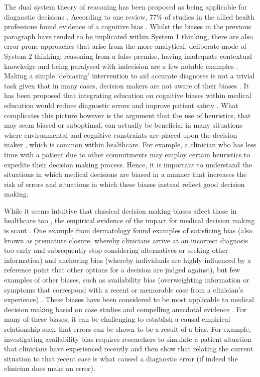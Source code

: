 \documentclass[a4paper, nobind]{templates/ociamthesis}
\begin{document}
\hfill\break
The dual system theory of reasoning has been proposed as being applicable for diagnostic decisions \autocite{croskerry_clinical_2009}. According to one review, 77\% of studies in the allied health professions found evidence of a cognitive bias \autocite{featherston_decision_2020}. Whilst the biases in the previous paragraph have tended to be implicated within System 1 thinking, there are also error-prone approaches that arise from the more analytical, deliberate mode of System 2 thinking: reasoning from a false premise, having inadequate contextual knowledge and being paralysed with indecision are a few notable examples \autocite{croskerry_deciding_2014}. Making a simple `debiasing' intervention to aid accurate diagnoses is not a trivial task given that in many cases, decision makers are not aware of their biases \autocite{croskerry_mindless_2013}. It has been proposed that integrating education on cognitive biases within medical education would reduce diagnostic errors and improve patient safety \autocite{royce_teaching_2019}. What complicates this picture however is the argument that the use of heuristics, that may seem biased or suboptimal, can actually be beneficial in many situations where environmental and cognitive constraints are placed upon the decision maker \autocite{gigerenzer_why_2008}, which is common within healthcare. For example, a clinician who has less time with a patient due to other commitments may employ certain heuristics to expedite their decision making process. Hence, it is important to understand the situations in which medical decisions are biased in a manner that increases the risk of errors and situations in which these biases instead reflect good decision making.

\hfill\break
While it seems intuitive that classical decision making biases affect those in healthcare too \autocite{restrepo_annals_2020}, the empirical evidence of the impact for medical decision making is scant \autocite{van_den_berge_cognitive_2013}. One example from dermatology found examples of satisficing bias (also known as premature closure, whereby clinicians arrive at an incorrect diagnosis too early and subsequently stop considering alternatives or seeking other information) and anchoring bias (whereby individuals are highly influenced by a reference point that other options for a decision are judged against), but few examples of other biases, such as availability bias (overweighting information or symptoms that correspond with a recent or memorable case from a clinician's experience) \autocite{crowley_automated_2013}. These biases have been considered to be most applicable to medical decision making based on case studies and compelling anecdotal evidence \autocite{groopman_how_2010}. For many of these biases, it can be challenging to establish a causal empirical relationship such that errors can be shown to be a result of a bias. For example, investigating availability bias requires researchers to simulate a patient situation that clinicians have experienced recently and then show that relating the current situation to that recent case is what caused a diagnostic error (if indeed the clinician does make an error).
\end{document}
